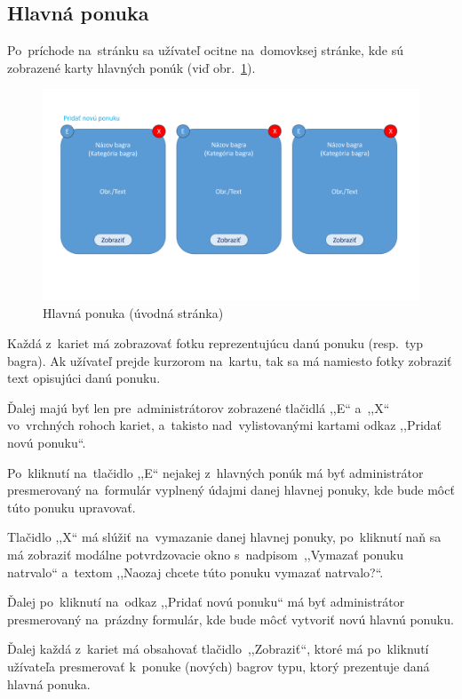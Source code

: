 \subsection{Hlavná ponuka}

Po~príchode na~stránku sa užívateľ ocitne na~domovksej stránke, kde sú zobrazené karty hlavných ponúk (viď obr.~\ref{main offer cards}).

\begin{figure}[H]\centering
\includegraphics[width=140mm]{../img/UI concept/main offer cards}
\caption{Hlavná ponuka (úvodná stránka)}
\label{main offer cards}
\end{figure}

Každá z~kariet má zobrazovať fotku reprezentujúcu danú ponuku (resp.~typ bagra). Ak užívateľ prejde kurzorom na~kartu, tak sa má namiesto fotky zobraziť text opisujúci danú ponuku. 

Ďalej majú byť len pre~administrátorov zobrazené tlačidlá ,,E`` a~,,X`` vo~vrchných rohoch kariet, a~takisto nad~vylistovanými kartami odkaz ,,Pridať novú ponuku``.

Po~kliknutí na~tlačidlo ,,E`` nejakej z~hlavných ponúk má byť administrátor presmerovaný na~formulár vyplnený údajmi danej hlavnej ponuky, kde bude môcť túto ponuku upravovať.

Tlačidlo ,,X`` má slúžiť na~vymazanie danej hlavnej ponuky, po~kliknutí naň sa má zobraziť modálne potvrdzovacie okno s~nadpisom~,,Vymazať ponuku natrvalo`` a~textom ,,Naozaj chcete túto ponuku vymazať natrvalo?``.

Ďalej po~kliknutí na~odkaz ,,Pridať novú ponuku`` má byť administrátor presmerovaný na~prázdny formulár, kde bude môcť vytvoriť novú hlavnú ponuku.

Ďalej každá z~kariet má obsahovať tlačidlo~,,Zobraziť``, ktoré má po~kliknutí užívateľa presmerovať k~ponuke (nových) bagrov typu, ktorý prezentuje daná hlavná ponuka.

